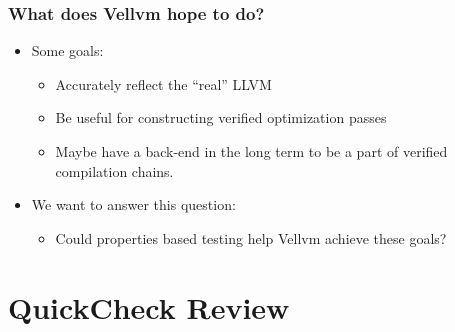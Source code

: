 \documentclass{beamer}
\begin{document}
\begin{frame}
  \frametitle{What does Vellvm hope to do?}

  \begin{itemize}
  \item Some goals:
    \begin{itemize}
    \item Accurately reflect the ``real'' LLVM
    \item Be useful for constructing verified optimization passes
    \item Maybe have a back-end in the long term to be a part of
      verified compilation chains.
    \end{itemize}

  \item We want to answer this question:
    
    \begin{itemize}
    \item Could properties based testing help Vellvm achieve these
      goals?
    \end{itemize}
  \end{itemize}
\end{frame}

\section{QuickCheck Review}
\end{document}
